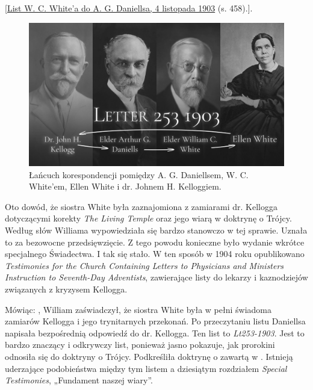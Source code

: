 [\href{https://ellenwhite.org/letterbooks/555}{List W. C. White'a do A. G. Daniellsa, 4 listopada 1903} (s. 458).].

\begin{figure}[h]
    \centering
    \includegraphics[width=1\linewidth]{images/correspondance.jpg}
    \caption*{Łańcuch korespondencji pomiędzy A. G. Daniellsem, W. C. White'em, Ellen White i dr. Johnem H. Kelloggiem.}
    \label{fig:corespondance}
\end{figure}

Oto dowód, że siostra White była zaznajomiona z zamiarami dr. Kellogga dotyczącymi korekty \textit{The Living Temple} oraz jego wiarą w doktrynę o Trójcy. Według słów Williama wypowiedziała się bardzo stanowczo w tej sprawie. Uznała to za bezowocne przedsięwzięcie. Z tego powodu konieczne było wydanie wkrótce specjalnego Świadectwa. I tak się stało. W ten sposób w 1904 roku opublikowano \textit{Testimonies for the Church Containing Letters to Physicians and Ministers Instruction to Seventh-Day Adventists}, zawierające listy do lekarzy i kaznodziejów związanych z kryzysem Kellogga.

Mówiąc: , William zaświadczył, że siostra White była w pełni świadoma zamiarów Kellogga i jego trynitarnych przekonań. Po przeczytaniu listu Daniellsa napisała bezpośrednią odpowiedź do dr. Kellogga. Ten list to \textit{Lt253-1903}. Jest to bardzo znaczący i odkrywczy list, ponieważ jasno pokazuje, jak prorokini odnosiła się do doktryny o Trójcy. Podkreśliła doktrynę o  zawartą w . Istnieją uderzające podobieństwa między tym listem a dziesiątym rozdziałem \textit{Special Testimonies}, „Fundament naszej wiary”.


